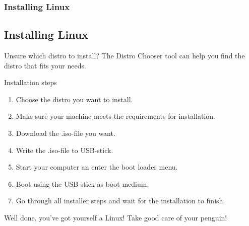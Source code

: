 \begin{frame}
	\frametitle{Installing Linux}
	\subsection{Installing Linux}
	
	\begin{alertblock}{Unsure which distro to install?}
		The Distro Chooser\cite{distrochooser} tool can help you find the distro that fits your needs.
	\end{alertblock}

	\vfill

	\begin{block}{Installation steps}
		\begin{enumerate}
			\item Choose the distro you want to install.
			\item Make sure your machine meets the requirements for installation.
			\item Download the .iso-file you want.
			\item Write the .iso-file to USB-stick.
			\item Start your computer an enter the boot loader menu.
			\item Boot using the USB-stick as boot medium.
			\item Go through all installer steps and wait for the installation to finish.
		\end{enumerate}
	\end{block}

	\vfill
	
	\begin{exampleblock}{Well done, you've got yourself a Linux!}
		Take good care of your penguin!
	\end{exampleblock}
	
\end{frame}
